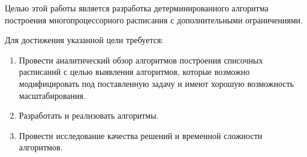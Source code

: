 Целью этой работы является разработка детерминированного алгоритма построения многопроцессорного расписания с дополнительными ограничениями.

Для достижения указанной цели требуется:
\begin{enumerate}
    \item Провести аналитический обзор алгоритмов построения списочных расписаний с целью выявления алгоритмов, которые возможно модифицировать под поставленную задачу и имеют хорошую возможность масштабирования.
    \item Разработать и реализовать алгоритмы.
    \item Провести исследование качества решений и временной сложности алгоритмов.
\end{enumerate}